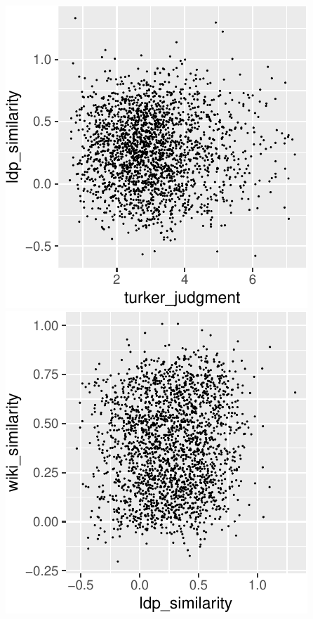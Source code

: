 \documentclass[10pt, letterpaper]{article}
\newenvironment{CodeChunk}{}{}
\begin{document}
\begin{CodeChunk}

\includegraphics{figs/models-1} 
\includegraphics{figs/models-2} 

\end{CodeChunk}
\end{document}
